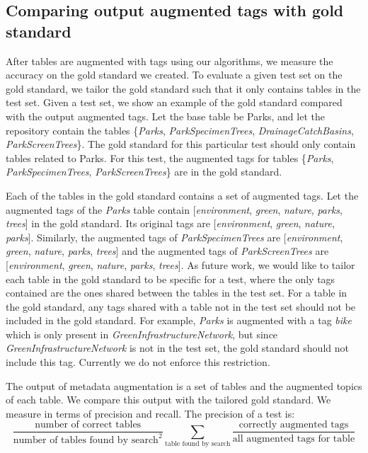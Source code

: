 \subsection{Comparing output augmented tags with gold standard}
\label{ssec:ComparingOutputAugmentedTagsWithGoldStandard}

After tables are augmented with tags using our algorithms, we measure the accuracy on the gold standard we created. To evaluate a given test set on the gold standard, we tailor the gold standard such that it only contains tables in the test set. Given a test set, we show an example of the gold standard compared with the output augmented tags. Let the base table be Parks, and let the repository contain the tables  \{\textit{Parks}, \textit{ParkSpecimenTrees}, \textit{DrainageCatchBasins}, \textit{ParkScreenTrees}\}. The gold standard for this particular test should only contain tables related to Parks. For this test, the augmented tags for tables \{\textit{Parks}, \textit{ParkSpecimenTrees}, \textit{ParkScreenTrees}\} are in the gold standard.

Each of the tables in the gold standard contains a set of augmented tags. Let the augmented tags of the \textit{Parks} table contain [\textit{environment}, \textit{green}, \textit{nature}, \textit{parks}, \textit{trees}] in the gold standard. Its original tags are [\textit{environment}, \textit{green}, \textit{nature}, \textit{parks}]. Similarly, the augmented tags of \textit{ParkSpecimenTrees} are [\textit{environment}, \textit{green}, \textit{nature}, \textit{parks}, \textit{trees}] and the augmented tags of \textit{ParkScreenTrees} are [\textit{environment}, \textit{green}, \textit{nature}, \textit{parks}, \textit{trees}]. As future work, we would like to tailor each table in the gold standard to be specific for a test, where the only tags contained are the ones shared between the tables in the test set. For a table in the gold standard, any tags shared with a table not in the test set should not be included in the gold standard. For example, \textit{Parks} is augmented with a tag \textit{bike} which is only present in \textit{GreenInfrastructureNetwork}, but since \textit{GreenInfrastructureNetwork} is not in the test set, the gold standard should not include this tag. Currently we do not enforce this restriction.

The output of metadata augmentation is a set of tables and the augmented topics of each table. We compare this output with the tailored gold standard. We measure in terms of precision and recall. The precision of a test is:
\[
\frac{\text{number of correct tables}}{\text{number of tables found by search}^{2}}\sum\limits _{\text{table found by search}}\frac{\text{correctly augmented tags}}{\text{all augmented tags for table}}
\]

